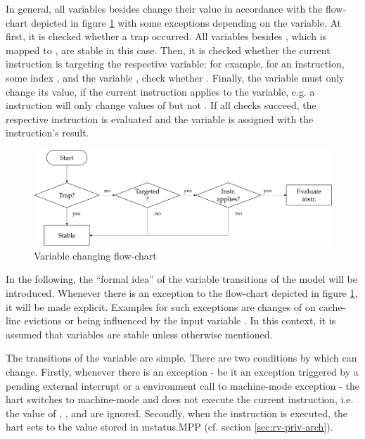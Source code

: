 In general, all variables besides  change their value in accordance with the flow-chart depicted in figure \ref{fig:implementation-flow} with some exceptions depending on the variable.
At first, it is checked whether a trap occurred.
All variables besides , which is mapped to , are stable in this case.
Then, it is checked whether the current instruction is targeting the respective variable: for example, for an  instruction, some index , and the variable , check whether .
Finally, the variable must only change its value, if the current instruction applies to the variable, e.g. a  instruction will only change values of  but not .
If all checks succeed, the respective instruction is evaluated and the variable is assigned with the instruction's result.

\begin{figure}
    \centering
    \includegraphics[width=\textwidth]{figures/implementation-flow.png}
    \caption{Variable changing flow-chart}
    \label{fig:implementation-flow}
\end{figure}

In the following, the \enquote{formal idea} of the variable transitions of the model will be introduced.
Whenever there is an exception to the flow-chart depicted in figure \ref{fig:implementation-flow}, it will be made explicit.
Examples for such exceptions are changes of  on cache-line evictions or  being influenced by the input variable .
In this context, it is assumed that variables are stable unless otherwise mentioned.

The transitions of the  variable are simple.
There are two conditions by which  can change.
Firstly, whenever there is an exception - be it an exception triggered by a pending external interrupt or a environment call to machine-mode exception - the \gls{hart} switches to machine-mode and does not execute the current instruction, i.e. the value of , ,  and  are ignored.
Secondly, when the  instruction is executed, the \gls{hart} sets  to the value stored in \gls{mstatus}.MPP (cf. section \ref{sec:rv-priv-arch}).

